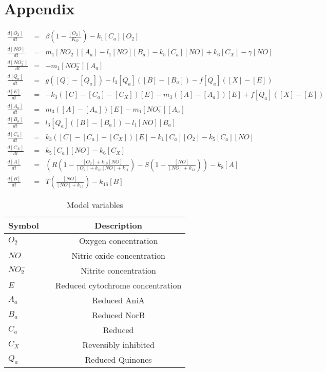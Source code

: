 \appendix
\chapter{Appendix}
\begin{eqnarray}
\frac{d[O_2]}{dt} & = & \beta\left(1-\frac{[O_2]}{K_O}\right) - k_{1}[C_a][O_2] \nonumber \\
\frac{d[NO]}{dt} & = & m_{1}[NO_2^-][A_a] - l_1[NO][B_a] - k_5[C_a][NO] + k_6[C_X] - \gamma[NO] \nonumber \\
\frac{d[NO_2^-]}{dt} & = & - m_{1}[NO_2^-][A_a] \nonumber \\
\frac{d[Q_a]}{dt} & = & g([Q] - [Q_a]) - l_3[Q_a]([B] - [B_a]) - f[Q_a]([X]-[E])\ \nonumber \\
\frac{d[E]}{dt} & = & -k_3([C] - [C_a] - [C_X])[E] - m_3([A] - [A_a])[E] + f[Q_a]([X]-[E]) \nonumber \\
\frac{d[A_a]}{dt} & = & m_3([A] - [A_a])[E] - m_{1}[NO_2^-][A_a] \nonumber \\
\frac{d[B_a]}{dt} & = & l_3[Q_a]([B] - [B_a]) - l_1[NO][B_a] \nonumber \\
\frac{d[C_a]}{dt} & = & k_3([C] - [C_a] - [C_X])[E] - k_{1}[C_a][O_2] - k_{5}[C_a][NO] \nonumber \\
\frac{d[C_X]}{dt} & = & k_5[C_a][NO] - k_6 [C_X] \nonumber \\
\frac{d[A]}{dt} & = & \left(R\left(1 - \frac{[O_2] + k_{10}[NO]}{[O_2] + k_{10}[NO] + k_{11}}\right) - S\left(1 - \frac{[NO]}{[NO] + k_{13}}\right)\right) - k_8[A] \nonumber \\
\frac{d[B]}{dt} & = & T \left(\frac{[NO]}{[NO] + k_{15}}\right) - k_{16}[B]
\end{eqnarray}

\begin{table}[ht]
\begin{center}
\caption{Model variables}
\begin{tabular}{lcc}
\toprule
\textbf{Symbol} & & \textbf{Description}\\
\midrule
$O_2$ & & Oxygen concentration\\
$NO$ & & Nitric oxide concentration\\
$NO_2^-$ & & Nitrite concentration\\
$E$ & & Reduced cytochrome concentration\\
$A_a$& & Reduced AniA\\
$B_a$& & Reduced NorB\\
$C_a$& & Reduced \cbbthree{}\\
$C_X$& & Reversibly inhibited \cbbthree{}\\
$Q_a$& & Reduced Quinones\\
\bottomrule
\end{tabular}
\label{vs}
\end{center}
\end{table}



